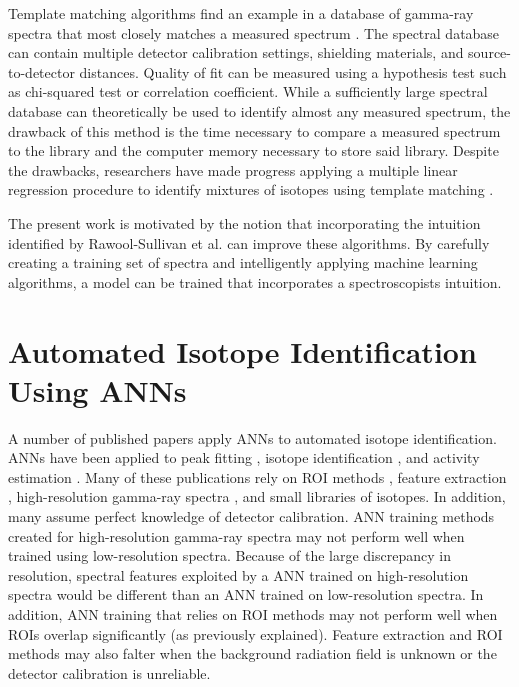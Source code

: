 Template matching algorithms find an example in a database of gamma-ray spectra that most closely matches a measured spectrum \cite{burr2009}. The spectral database can contain multiple detector calibration settings, shielding materials, and source-to-detector distances. Quality of fit can be measured using a hypothesis test such as chi-squared test or correlation coefficient. While a sufficiently large spectral database can theoretically be used to identify almost any measured spectrum, the drawback of this method is the time necessary to compare a measured spectrum to the library and the computer memory necessary to store said library. Despite the drawbacks, researchers have made progress applying a multiple linear regression procedure to identify mixtures of isotopes using template matching \cite{mattingly2010}.

The present work is motivated by the notion that incorporating the intuition identified by Rawool-Sullivan et al. can improve these algorithms. By carefully creating a training set of spectra and intelligently applying machine learning algorithms, a model can be trained that incorporates a spectroscopists intuition.


\section{Automated Isotope Identification Using ANNs}

A number of published papers apply ANNs to automated isotope identification. ANNs have been applied to peak fitting \cite{Abdel-Aal2002}, isotope identification \cite{Abdel-Aal1996, Medhat2012}, and activity estimation \cite{Abdel-Aal1996, Vigneron1996}. Many of these publications rely on ROI methods \cite{Pilato1999}, feature extraction \cite{Chen2009}, high-resolution gamma-ray spectra \cite{Yoshida2002}, and small libraries of isotopes. In addition, many assume perfect knowledge of detector calibration. ANN training methods created for high-resolution gamma-ray spectra may not perform well when trained using low-resolution spectra. Because of the large discrepancy in resolution, spectral features exploited by a ANN trained on high-resolution spectra would be different than an ANN trained on low-resolution spectra. In addition, ANN training that relies on ROI methods may not perform well when ROIs overlap significantly (as previously explained). Feature extraction and ROI methods may also falter when the background radiation field is unknown or the detector calibration is unreliable.  

